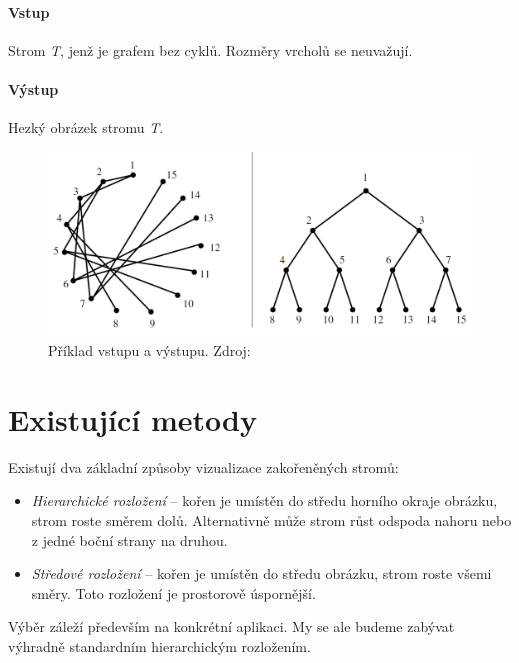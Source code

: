 \documentclass[12pt, a4paper]{report}
\begin{document}
\subsubsection*{Vstup}
Strom \emph{T}, jenž je grafem bez cyklů.
Rozměry vrcholů se neuvažují.

\subsubsection*{Výstup}
Hezký obrázek stromu \emph{T}.

\begin{figure}[ph]
	\centering
	\includegraphics[width=0.8\linewidth]{img-io-example}
	\caption{Příklad vstupu a výstupu. Zdroj: \cite{Skiena09}}
	\label{fig:io-example}
\end{figure}

\chapter{Existující metody}
Existují dva základní způsoby vizualizace zakořeněných stromů:
\begin{itemize}
	\item \emph{Hierarchické rozložení} -- kořen je umístěn do středu horního okraje obrázku, strom roste směrem dolů. Alternativně může strom růst odspoda nahoru nebo z jedné boční strany na druhou.
	\item \emph{Středové rozložení} -- kořen je umístěn do středu obrázku, strom roste všemi směry. Toto rozložení je prostorově úspornější.
\end{itemize}
Výběr záleží především na konkrétní aplikaci. My se ale budeme zabývat výhradně standardním hierarchickým rozložením.
\end{document}
